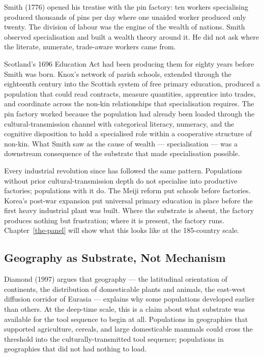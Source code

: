 \documentclass[12pt,letterpaper]{article}
\begin{document}
Smith (1776) opened his treatise with the pin factory: ten workers
specialising produced thousands of pins per day where one unaided
worker produced only twenty. The division of labour was the engine of
the wealth of nations. Smith observed specialisation and built a
wealth theory around it. He did not ask where the literate, numerate,
trade-aware workers came from.

Scotland's 1696 Education Act had been producing them for eighty
years before Smith was born. Knox's network of parish schools,
extended through the eighteenth century into the Scottish system of
free primary education, produced a population that could read
contracts, measure quantities, apprentice into trades, and coordinate
across the non-kin relationships that specialisation requires. The
pin factory worked because the population had already been loaded
through the cultural-transmission channel with categorical literacy,
numeracy, and the cognitive disposition to hold a specialised role
within a cooperative structure of non-kin. What Smith saw as the
cause of wealth --- specialisation --- was a downstream consequence
of the substrate that made specialisation possible.

Every industrial revolution since has followed the same pattern.
Populations without prior cultural-transmission depth do not
specialise into productive factories; populations with it do. The
Meiji reform put schools before factories. Korea's post-war expansion
put universal primary education in place before the first heavy
industrial plant was built. Where the substrate is absent, the
factory produces nothing but frustration; where it is present, the
factory runs. Chapter~\ref{the-panel} will show what this looks like
at the 185-country scale.

\subsection{Geography as Substrate, Not Mechanism}\label{geography-as-substrate-not-mechanism}

Diamond (1997) argues that geography --- the latitudinal orientation
of continents, the distribution of domesticable plants and animals,
the east-west diffusion corridor of Eurasia --- explains why some
populations developed earlier than others. At the deep-time scale,
this is a claim about what substrate was available for the tool
sequence to begin at all. Populations in geographies that supported
agriculture, cereals, and large domesticable mammals could cross the
threshold into the culturally-transmitted tool sequence; populations
in geographies that did not had nothing to load.
\end{document}

